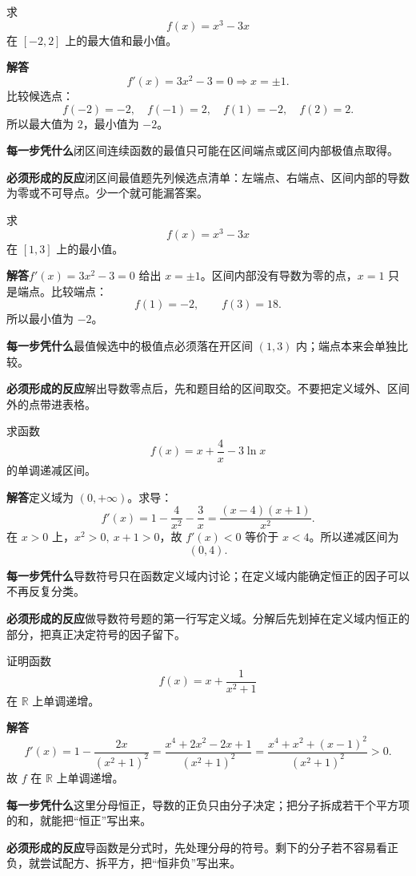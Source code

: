 \documentclass[11pt,fontset=fandol]{ctexart}
\newcommand{\R}{\mathbb R}
\newcommand{\answer}{\par\textbf{解答}\quad}
\newcommand{\basis}{\par\textbf{每一步凭什么}\quad}
\newcommand{\reaction}{\par\textbf{必须形成的反应}\quad}
\newenvironment{drill}[2]{
  \begin{tcolorbox}[colback=white,colframe=black!35,title={#1\quad\small #2},breakable]
}{\end{tcolorbox}}
\begin{document}
\begin{drill}{21. 区间最值不能漏端点}{甲种本《微积分初步》最值章节改编}
求
\[
f(x)=x^3-3x
\]
在 $[-2,2]$ 上的最大值和最小值。

\answer
\[
f'(x)=3x^2-3=0\Longrightarrow x=\pm1.
\]
比较候选点：
\[
f(-2)=-2,\quad f(-1)=2,\quad f(1)=-2,\quad f(2)=2.
\]
所以最大值为 $2$，最小值为 $-2$。

\basis 闭区间连续函数的最值只可能在区间端点或区间内部极值点取得。

\reaction 闭区间最值题先列候选点清单：左端点、右端点、区间内部的导数为零或不可导点。少一个就可能漏答案。
\end{drill}

\begin{drill}{22. 驻点不在区间内不能参与比较}{项目导数题库改编}
求
\[
f(x)=x^3-3x
\]
在 $[1,3]$ 上的最小值。

\answer $f'(x)=3x^2-3=0$ 给出 $x=\pm1$。区间内部没有导数为零的点，$x=1$ 只是端点。比较端点：
\[
f(1)=-2,\qquad f(3)=18.
\]
所以最小值为 $-2$。

\basis 最值候选中的极值点必须落在开区间 $(1,3)$ 内；端点本来会单独比较。

\reaction 解出导数零点后，先和题目给的区间取交。不要把定义域外、区间外的点带进表格。
\end{drill}

\begin{drill}{23. 导函数符号表的分界点来自定义域和零点}{步步高导数单调性题型改编}
求函数
\[
f(x)=x+\frac4x-3\ln x
\]
的单调递减区间。

\answer 定义域为 $(0,+\infty)$。求导：
\[
f'(x)=1-\frac4{x^2}-\frac3x
=\frac{(x-4)(x+1)}{x^2}.
\]
在 $x>0$ 上，$x^2>0,\ x+1>0$，故 $f'(x)<0$ 等价于 $x<4$。所以递减区间为
\[
(0,4).
\]

\basis 导数符号只在函数定义域内讨论；在定义域内能确定恒正的因子可以不再反复分类。

\reaction 做导数符号题的第一行写定义域。分解后先划掉在定义域内恒正的部分，把真正决定符号的因子留下。
\end{drill}

\begin{drill}{24. 导数是分式时，先把分子做成明显非负}{甲种本《微积分初步》单调性习题改编}
证明函数
\[
f(x)=x+\frac1{x^2+1}
\]
在 $\R$ 上单调递增。

\answer
\[
f'(x)=1-\frac{2x}{(x^2+1)^2}
=\frac{x^4+2x^2-2x+1}{(x^2+1)^2}
=\frac{x^4+x^2+(x-1)^2}{(x^2+1)^2}>0.
\]
故 $f$ 在 $\R$ 上单调递增。

\basis 这里分母恒正，导数的正负只由分子决定；把分子拆成若干个平方项的和，就能把“恒正”写出来。

\reaction 导函数是分式时，先处理分母的符号。剩下的分子若不容易看正负，就尝试配方、拆平方，把“恒非负”写出来。
\end{drill}
\end{document}
